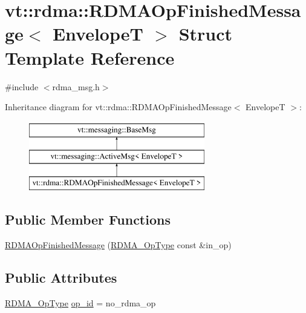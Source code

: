 \hypertarget{structvt_1_1rdma_1_1_r_d_m_a_op_finished_message}{}\section{vt\+:\+:rdma\+:\+:R\+D\+M\+A\+Op\+Finished\+Message$<$ EnvelopeT $>$ Struct Template Reference}
\label{structvt_1_1rdma_1_1_r_d_m_a_op_finished_message}


{\ttfamily \#include $<$rdma\+\_\+msg.\+h$>$}

Inheritance diagram for vt\+:\+:rdma\+:\+:R\+D\+M\+A\+Op\+Finished\+Message$<$ EnvelopeT $>$\+:\begin{figure}[H]
\begin{center}
\leavevmode
\includegraphics[height=3.000000cm]{structvt_1_1rdma_1_1_r_d_m_a_op_finished_message}
\end{center}
\end{figure}
\subsection*{Public Member Functions}
\begin{DoxyCompactItemize}
\item 
\hyperlink{structvt_1_1rdma_1_1_r_d_m_a_op_finished_message_a21b774aed56ddcef56fc49526647a0c7}{R\+D\+M\+A\+Op\+Finished\+Message} (\hyperlink{namespacevt_1_1rdma_a9b966d9780a2b41afe7cd7b7b4b20300}{R\+D\+M\+A\+\_\+\+Op\+Type} const \&in\+\_\+op)
\end{DoxyCompactItemize}
\subsection*{Public Attributes}
\begin{DoxyCompactItemize}
\item 
\hyperlink{namespacevt_1_1rdma_a9b966d9780a2b41afe7cd7b7b4b20300}{R\+D\+M\+A\+\_\+\+Op\+Type} \hyperlink{structvt_1_1rdma_1_1_r_d_m_a_op_finished_message_a548dcc848fb181b4afb9c48156a0d1b0}{op\+\_\+id} = no\+\_\+rdma\+\_\+op
\end{DoxyCompactItemize}
